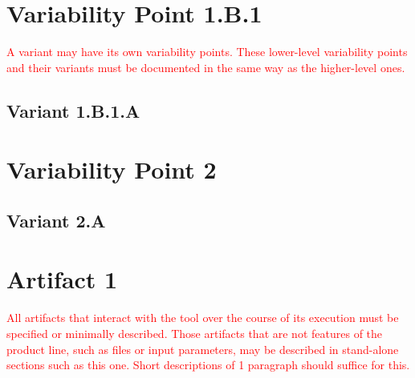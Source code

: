 
\section{Variability Point 1.B.1}

\textcolor{red}{A variant may have its own variability points. These lower-level variability points and their variants must be documented in the same way as the higher-level ones.}


\subsection{Variant 1.B.1.A}


\section{Variability Point 2}


\subsection{Variant 2.A}


\section{Artifact 1}

\textcolor{red}{All artifacts that interact with the tool over the course of its execution must be specified or minimally described. Those artifacts that are not features of the product line, such as files or input parameters, may be described in stand-alone sections such as this one. Short descriptions of 1 paragraph should suffice for this.}

